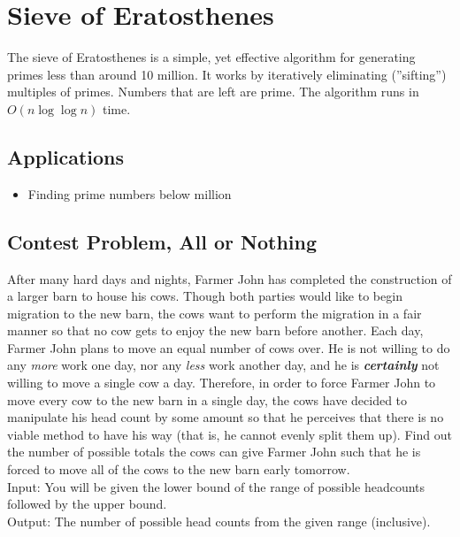 \section{Sieve of Eratosthenes}
The sieve of Eratosthenes is a simple, yet effective algorithm for generating primes less than around 10 million.
It works by iteratively eliminating (''sifting'') multiples of primes.
Numbers that are left are prime.
The algorithm runs in $O(n\log\log n)$ time.

\subsection{Applications}
\begin{itemize}
	\item	Finding prime numbers below  million
\end{itemize}

\subsection{Contest Problem, All or Nothing}
After many hard days and nights, Farmer John has completed the construction of a larger barn to house his cows.
Though both parties would like to begin migration to the new barn, the cows want to perform the migration in a fair manner so that no cow gets to enjoy the new barn before another.
Each day, Farmer John plans to move an equal number of cows over.
He is not willing to do any \textit{more} work one day, nor any \textit{less} work another day, and he is \textbf{\textit{certainly}} not willing to move a single cow a day.
Therefore, in order to force Farmer John to move every cow to the new barn in a single day, the cows have decided to manipulate his head count by some amount so that he perceives that there is no viable method to have his way (that is, he cannot evenly split them up).
Find out the number of possible totals the cows can give Farmer John such that he is forced to move all of the cows to the new barn early tomorrow.
\\Input: You will be given the lower bound of the range of possible headcounts followed by the upper bound.
\\Output: The number of possible head counts from the given range (inclusive).

